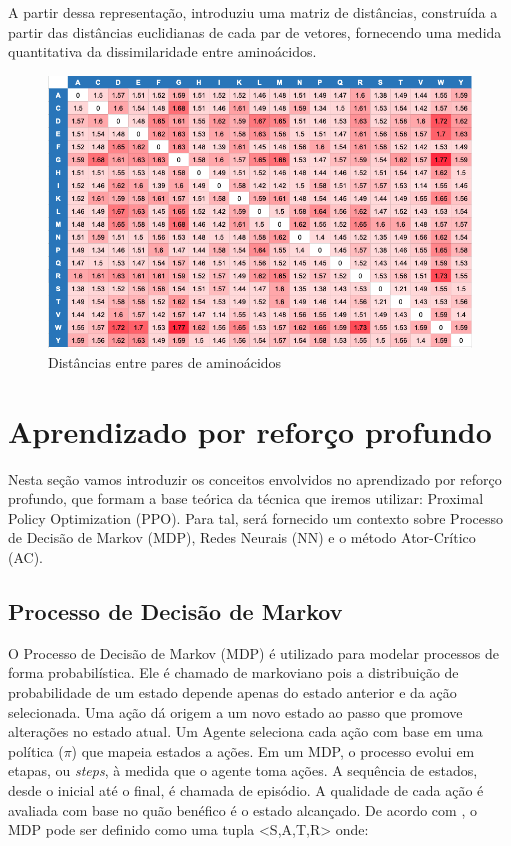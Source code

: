 A partir dessa representação, \cite{aminodist} introduziu
uma matriz de distâncias, construída a partir das distâncias euclidianas de cada par 
de vetores, fornecendo uma medida quantitativa da dissimilaridade entre aminoácidos.


\begin{figure}[H]
    \centering
    \includegraphics[width=.8\textwidth]{figuras/matrix_amino_dist.png}
    \caption[Distâncias entre aminoácidos]{Distâncias entre pares de aminoácidos \cite{aminodist}}
    \label{fig:matrixaminodist}
  \end{figure}


\section{Aprendizado por reforço profundo}
Nesta seção vamos introduzir os conceitos envolvidos no aprendizado por reforço profundo, que formam a base teórica da técnica que iremos utilizar: Proximal Policy Optimization (PPO). 
Para tal, será fornecido um contexto sobre Processo de Decisão de Markov (MDP), Redes Neurais (NN) e o método Ator-Crítico (AC). 


\subsection{Processo de Decisão de Markov}
O Processo de Decisão de Markov (MDP) é utilizado para modelar processos de forma probabilística. Ele é chamado de markoviano pois a distribuição de probabilidade de um estado depende apenas do estado anterior e da ação selecionada. Uma ação dá origem a um novo estado ao passo que promove alterações no estado atual. Um Agente seleciona cada ação com base em uma política ($\pi$) que mapeia estados a ações. Em um MDP, o processo evolui em etapas, ou \textit{steps}, à medida que o agente toma ações. A sequência de estados, desde o inicial até o final, é chamada de episódio. A qualidade de cada ação é avaliada com base no quão benéfico é o estado alcançado.
De acordo com \cite{MDP}, o MDP pode ser definido como uma tupla 
<S,A,T,R> onde:

